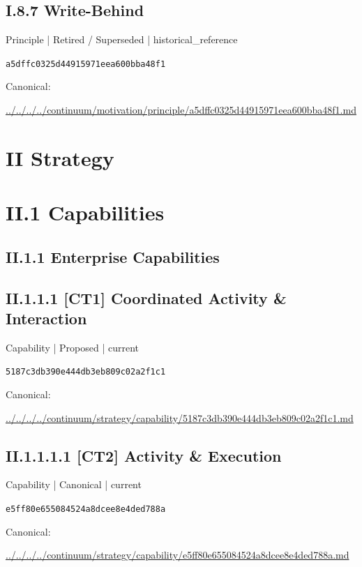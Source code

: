 \documentclass[10pt,a4paper]{article}
\begin{document}
\subsection*{I.8.7 Write-Behind}
\label{element-a5dffc0325d44915971eea600bba48f1}
{\small Principle | Retired / Superseded | historical\_reference}\par
\texttt{a5dffc0325d44915971eea600bba48f1}\par
Canonical: \par
{\footnotesize\url{../../../../continuum/motivation/principle/a5dffc0325d44915971eea600bba48f1.md}}\par
\section*{II Strategy}
\section*{II.1 Capabilities}
\subsection*{II.1.1 Enterprise Capabilities}
\subsection*{II.1.1.1 [CT1] Coordinated Activity \& Interaction}
\label{element-5187c3db390e444db3eb809c02a2f1c1}
{\small Capability | Proposed | current}\par
\texttt{5187c3db390e444db3eb809c02a2f1c1}\par
Canonical: \par
{\footnotesize\url{../../../../continuum/strategy/capability/5187c3db390e444db3eb809c02a2f1c1.md}}\par
\subsection*{II.1.1.1.1 [CT2] Activity \& Execution}
\label{element-e5ff80e655084524a8dcee8e4ded788a}
{\small Capability | Canonical | current}\par
\texttt{e5ff80e655084524a8dcee8e4ded788a}\par
Canonical: \par
{\footnotesize\url{../../../../continuum/strategy/capability/e5ff80e655084524a8dcee8e4ded788a.md}}\par
\end{document}
